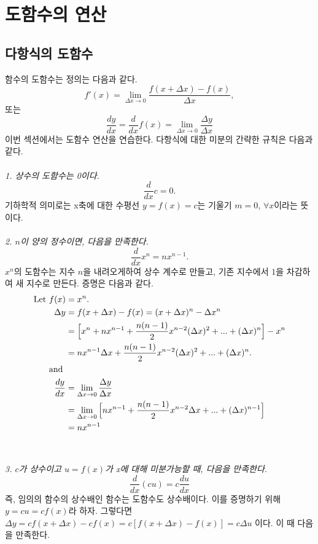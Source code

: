 \documentclass{article}
\begin{document}
\setcounter{section}{2}
\section{도함수의 연산}

\subsection{다항식의 도함수}

함수의 도함수는 정의는 다음과 같다.
\[
    f'(x) = \lim_{\Delta x \to 0}\frac{f(x+\Delta x)-f(x)}{\Delta x},
\]
또는
\[
    \frac{dy}{dx}=\frac{d}{dx}f(x) = \lim_{\Delta x \to 0}\frac{\Delta y}{\Delta x}
\]
이번 섹션에서는 도함수 연산을 연습한다. 
다항식에 대한 미분의 간략한 규칙은 다음과 같다.\\\\
\textit{1. 상수의 도함수는 0이다.}
\[
    \frac{d}{dx}c = 0.
\]
기하학적 의미로는 x축에 대한 수평선 $y=f(x)=c$는 기울기 $m=0$, $\forall x$이라는 뜻이다.
\\\\
\textit{2. $n$이 양의 정수이면, 다음을 만족한다.}  
\[
    \frac{d}{dx}x^{n}=nx^{n-1}.
\]
$x^n$의 도함수는 지수 $n$을 내려오게하여 상수 계수로 만들고, 기존 지수에서 $1$을 차감하여 새 지수로 만든다.
증명은 다음과 같다.
\begin{align*}
    \text{Let } f(x)&=x^n. \\
    \Delta y&= f(x+\Delta x) - f(x) = (x+\Delta x)^n - \Delta x^n \\
            &= \Big{[}x^n+nx^{n-1}+\frac{n(n-1)}{2}x^{n-2}(\Delta x)^2 + ... + (\Delta x)^n \Big{]} - x^n \\
            &= nx^{n-1}\Delta x + \frac{n(n-1)}{2}x^{n-2}(\Delta x)^2 + ... + (\Delta x)^n.\\
    \text{and } \\
    \frac{dy}{dx} &= \lim_{\Delta x \to 0}\frac{\Delta y}{\Delta x}\\
    &= \lim_{\Delta x \to 0}\Big{[}nx^{n-1} + \frac{n(n-1)}{2}x^{n-2}\Delta x + ... + (\Delta x)^{n-1}\Big{]}\\
    &= nx^{n-1}
\end{align*}
\\\\
\textit{3. $c$가 상수이고 $u=f(x)$가 x에 대해 미분가능할 때, 다음을 만족한다.}\\  
\[
    \frac{d}{dx}(cu)=c\frac{du}{dx}
\]
즉, 임의의 함수의 상수배인 함수는 도함수도 상수배이다. 이를 증명하기 위해 $y=cu=cf(x)$라 하자. 
그렇다면 $\Delta y = cf(x+\Delta x)-cf(x)=c[f(x+\Delta x)-f(x)]=c\Delta u$ 이다. 이 때 다음을 만족한다.  
\end{document}

